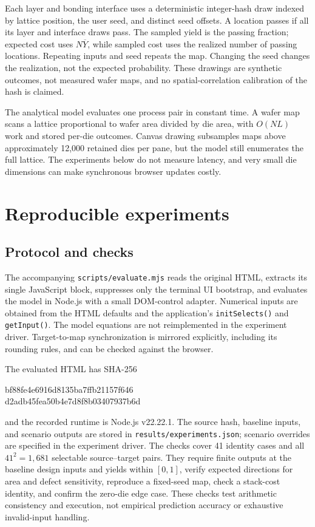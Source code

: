 \documentclass[11pt,a4paper]{article}
\begin{document}
Each layer and bonding interface uses a deterministic integer-hash draw
indexed by lattice position, the user seed, and distinct seed offsets.
A location passes if all its layer and interface draws pass. The sampled
yield is the passing fraction; expected cost uses $N\overline{Y}$, while
sampled cost uses the realized number of passing locations. Repeating
inputs and seed repeats the map. Changing the seed changes the realization,
not the expected probability. These drawings are synthetic outcomes, not
measured wafer maps, and no spatial-correlation calibration of the hash is
claimed.

The analytical model evaluates one process pair in constant time. A wafer
map scans a lattice proportional to wafer area divided by die area, with
$O(NL)$ work and stored per-die outcomes. Canvas drawing subsamples maps
above approximately 12,000 retained dies per pane, but the model still
enumerates the full lattice. The experiments below do not measure latency,
and very small die dimensions can make synchronous browser updates costly.

\section{Reproducible experiments}
\label{sec:experiments}
\subsection{Protocol and checks}
The accompanying \texttt{scripts/evaluate.mjs} reads the original HTML,
extracts its single JavaScript block, suppresses only the terminal UI
bootstrap, and evaluates the model in Node.js with a small DOM-control
adapter. Numerical inputs are obtained from the HTML defaults and the
application's \texttt{initSelects()} and \texttt{getInput()}. The model
equations are not reimplemented in the experiment driver. Target-to-map
synchronization is mirrored explicitly, including its rounding rules, and
can be checked against the browser.

The evaluated HTML has SHA-256
\begin{center}\small\ttfamily
bf88fe4e6916d8135ba7ffb21157f646\\
d2adb45fea50b4e7d8f8b03407937b6d
\end{center}
and the recorded runtime is Node.js v22.22.1. The source hash, baseline inputs,
and scenario outputs are stored in \texttt{results/experiments.json};
scenario overrides are specified in the experiment driver.
The checks cover 41 identity cases and all $41^2=1{,}681$ selectable
source--target pairs. They require finite outputs at the baseline design
inputs and yields within $[0,1]$, verify expected directions for area and
defect sensitivity, reproduce a fixed-seed map, check a stack-cost identity,
and confirm the zero-die edge case. These checks test arithmetic consistency
and execution, not empirical prediction accuracy or exhaustive invalid-input
handling.
\end{document}
